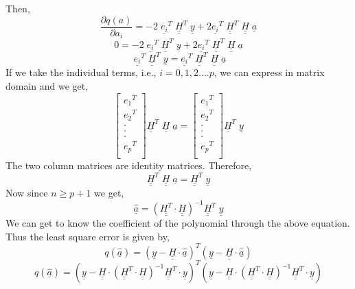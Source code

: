 \noindent Then,
$$\frac{\partial q(a)}{\partial a_i} = -2 \; \underline{e_i}^T\; \underline{\underline{H}}^T \; \underline{y} + 2 \underline{e_i}^{T} \;\underline{\underline{H}}^T\;\underline{\underline{H}}\; \underline{a} $$
$$0 = -2 \; \underline{e_i}^T\; \underline{\underline{H}}^T \; \underline{y} + 2 \underline{e_i}^{T} \;\underline{\underline{H}}^T\;\underline{\underline{H}}\; \underline{a} $$
$$ \; \underline{e_i}^T\; \underline{\underline{H}}^T \; \underline{y} =  \underline{e_i}^{T} \;\underline{\underline{H}}^T\;\underline{\underline{H}}\; \underline{a} $$
\noindent If we take the individual terms, i.e., $i=0,1,2....p$, we can express in matrix domain and we get,
$$  \begin{bmatrix}
{e_1}^T\\
{e_2}^T\\
.\\
.\\
.\\
{e_p}^T\\
\end{bmatrix} 
 \underline{\underline{H}}^T\;\underline{\underline{H}}\; \underline{a} 
 = 
 \begin{bmatrix}
{e_1}^T\\
{e_2}^T\\
.\\
.\\
.\\
{e_p}^T\\ \end{bmatrix} \underline{\underline{H}}^T \; \underline{y}   $$
\noindent The two column matrices are identity matrices. Therefore,
$$ \underline{\underline{H}}^T\;\underline{\underline{H}}\; \underline{a} = \underline{\underline{H}}^T \; \underline{y}  $$
\noindent Now since $n \geq p+1$ we get,
$$\underline{\hat{a}} = (\underline{\underline{H^T}} \cdot \underline{\underline{H}})^{-1}\underline{\underline{H}}^T\;\underline{y}$$
\noindent We can get to know the coefficient of the polynomial through the above equation. Thus the least square error is given by,
$$q(\underline{\hat{a}}) = (\underline{y} - \underline{\underline{H}} \cdot \underline{\hat{a}})^T (\underline{y} - \underline{\underline{H}} \cdot \underline{\hat{a}}) $$
$$q(\underline{\hat{a}}) = (\underline{y}-\underline{\underline{H}} \cdot (\underline{\underline{H}}^T \cdot \underline{\underline{H}})^{-1}\underline{\underline{H}}^T \cdot \underline{y})^T
(\underline{y} - \underline{\underline{H}} \cdot (\underline{\underline{H}}^T\cdot \underline{\underline{H}})^{-1}\underline{\underline{H}}^T\cdot \underline{y}) $$
